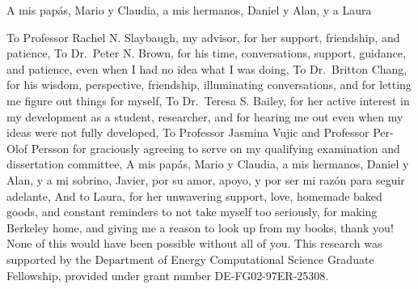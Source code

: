\documentclass{ucbthesis}
\theoremstyle{definition}
\begin{document}
\begin{frontmatter}

\begin{dedication}
\null\vfil
\begin{center}
A mis pap\'{a}s, Mario y Claudia, a mis hermanos, Daniel y Alan, y a Laura\\\vspace{12pt}
\end{center}
\vfil\null
\end{dedication}


\tableofcontents
\clearpage
\listoffigures
\clearpage
\listoftables

\begin{acknowledgements}

To Professor Rachel N. Slaybaugh, my advisor, for her support, friendship, and patience,
\null\vfil
To Dr.~Peter N. Brown, for his time, conversations, support, guidance, and patience, even when I had no idea what I was doing,
\null\vfil
To Dr.~Britton Chang, for his wisdom, perspective, friendship, illuminating conversations, and for letting me figure out things for myself,
\null\vfil
To Dr.~Teresa S. Bailey, for her active interest in my development as a student, researcher, and for hearing me out even when my ideas were not fully developed,
\null\vfil
To Professor Jasmina Vujic and Professor Per-Olof Persson for graciously agreeing to serve on my qualifying examination and dissertation committee,
\null\vfil
A mis pap\'{a}s, Mario y Claudia, a mis hermanos, Daniel y Alan, y a mi sobrino, Javier, por su amor, apoyo, y por ser mi raz\'{o}n para seguir adelante,
\null\vfil
And to Laura, for her unwavering support, love, homemade baked goods, and constant reminders to not take myself too seriously, for making Berkeley home, and giving me a reason to look up from my books,
\null\vfil
thank you! None of this would have been possible without all of you.
\null\vfil
This research was supported by the Department of Energy Computational
Science Graduate Fellowship, provided under grant number DE-FG02-97ER-25308.


\end{acknowledgements}

\end{frontmatter}

\pagestyle{headings}

\end{document}
